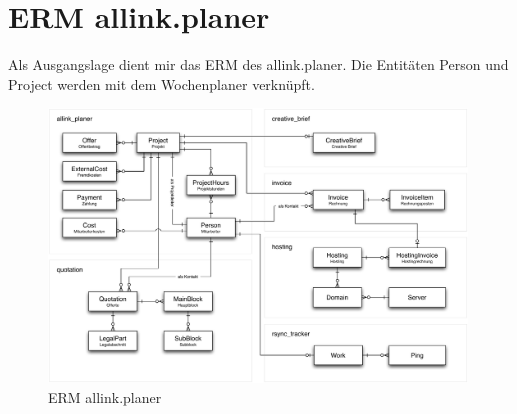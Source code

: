\section{ERM allink.planer}
Als Ausgangslage dient mir das ERM des allink.planer. Die Entitäten Person und Project werden mit dem Wochenplaner verknüpft.

\begin{figure}[!ht]
\begin{center}
\includegraphics[width=0.99\textwidth,angle=0]{./bilder/erm_planer.pdf}
\caption{ERM allink.planer}
\end{center}
\end{figure}

\clearpage

